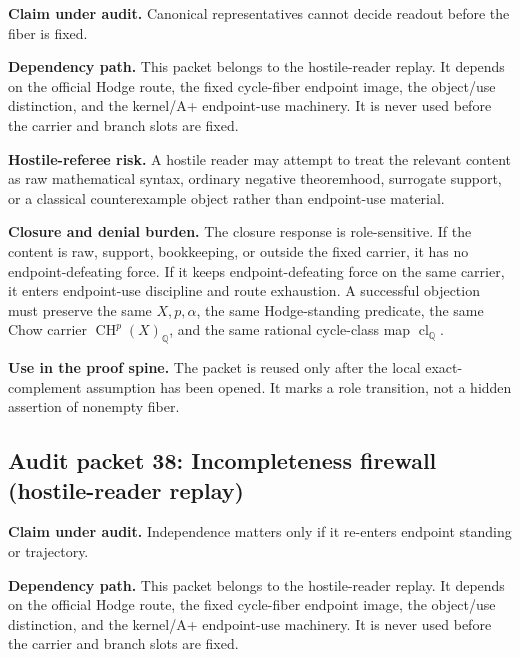 \documentclass[11pt]{article}
\newcommand{\QQ}{\mathbb{Q}}
\newcommand{\CH}{\operatorname{CH}}
\newcommand{\clQ}{\operatorname{cl}_{\QQ}}
\begin{document}
\par\noindent\textbf{Claim under audit.} Canonical representatives cannot decide readout before the fiber is fixed.


\par\noindent\textbf{Dependency path.} This packet belongs to the hostile-reader replay. It depends on the official Hodge route, the fixed cycle-fiber endpoint image, the object/use distinction, and the kernel/A+ endpoint-use machinery. It is never used before the carrier and branch slots are fixed.


\par\noindent\textbf{Hostile-referee risk.} A hostile reader may attempt to treat the relevant content as raw mathematical syntax, ordinary negative theoremhood, surrogate support, or a classical counterexample object rather than endpoint-use material.


\par\noindent\textbf{Closure and denial burden.} The closure response is role-sensitive. If the content is raw, support, bookkeeping, or outside the fixed carrier, it has no endpoint-defeating force. If it keeps endpoint-defeating force on the same carrier, it enters endpoint-use discipline and route exhaustion. A successful objection must preserve the same $X,p,\alpha$, the same Hodge-standing predicate, the same Chow carrier $\CH^p(X)_\QQ$, and the same rational cycle-class map $\clQ$.


\par\noindent\textbf{Use in the proof spine.} The packet is reused only after the local exact-complement assumption has been opened. It marks a role transition, not a hidden assertion of nonempty fiber.


\subsection{Audit packet 38: Incompleteness firewall (hostile-reader replay)}


\par\noindent\textbf{Claim under audit.} Independence matters only if it re-enters endpoint standing or trajectory.


\par\noindent\textbf{Dependency path.} This packet belongs to the hostile-reader replay. It depends on the official Hodge route, the fixed cycle-fiber endpoint image, the object/use distinction, and the kernel/A+ endpoint-use machinery. It is never used before the carrier and branch slots are fixed.
\end{document}
